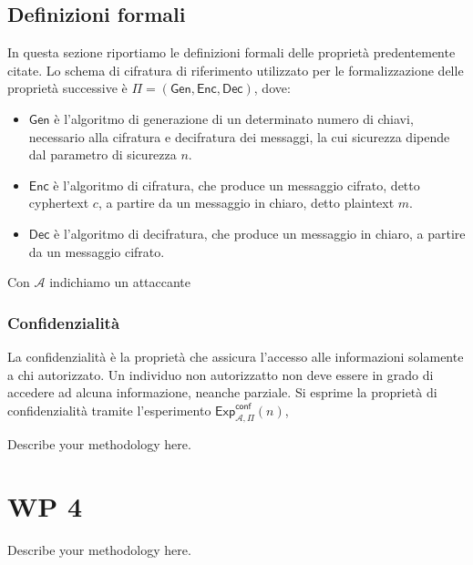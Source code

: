 \documentclass[a4paper,12pt]{article}
\begin{document}
\subsection{Definizioni formali}
In questa sezione riportiamo le definizioni formali delle proprietà predentemente citate. 
\newline 
Lo schema di cifratura di riferimento utilizzato per le formalizzazione delle proprietà successive è $\Pi =\mathsf{(Gen,Enc,Dec)}$, dove: 
\begin{itemize}
    \item $\mathsf{Gen}$ è l'algoritmo di generazione di un determinato numero di chiavi, necessario alla cifratura e decifratura dei messaggi, la cui sicurezza dipende dal parametro di sicurezza $n$.
    \item $\mathsf{Enc}$ è l'algoritmo di cifratura, che produce un messaggio cifrato, detto cyphertext $c$, a partire da un messaggio in chiaro, detto plaintext $m$.
    \item $\mathsf{Dec}$ è l'algoritmo di decifratura, che produce un messaggio in chiaro, a partire da un messaggio cifrato.
\end{itemize}
Con $\mathcal{A}$ indichiamo un attaccante 

\subsubsection{Confidenzialità}
La confidenzialità è la proprietà che assicura l'accesso alle informazioni solamente a chi autorizzato. Un individuo non autorizzatto non deve essere in grado di accedere ad alcuna informazione, neanche parziale. 
\newline Si esprime la proprietà di confidenzialità tramite l'esperimento $\mathsf{Exp}_{\mathcal A,\Pi}^\mathsf{conf}(n)$,

Describe your methodology here.
\newpage
\section{WP 4}
Describe your methodology here.
\end{document}
